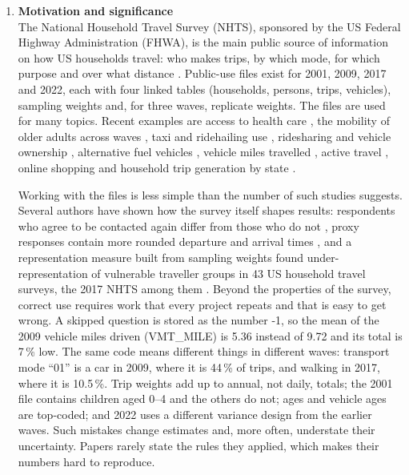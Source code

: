 \documentclass[preprint,12pt, a4paper]{elsarticle}
\begin{document}
\begin{enumerate}

\item \textbf{Motivation and significance}\label{sec:motivation}\\

The National Household Travel Survey (NHTS), sponsored by the US Federal Highway Administration (FHWA), is the main public source of information on how US households travel: who makes trips, by which mode, for which purpose and over what distance \cite{mcguckin}. Public-use files exist for 2001, 2009, 2017 and 2022, each with four linked tables (households, persons, trips, vehicles), sampling weights and, for three waves, replicate weights. The files are used for many topics. Recent examples are access to health care \cite{labban}, the mobility of older adults across waves \cite{buehler,akinlotan,lidbe}, taxi and ridehailing use \cite{conway,rafiq}, ridesharing and vehicle ownership \cite{zhang}, alternative fuel vehicles \cite{li}, vehicle miles travelled \cite{alberini,wu}, active travel \cite{yang}, online shopping \cite{zhou} and household trip generation by state \cite{naseralavi}.

Working with the files is less simple than the number of such studies suggests. Several authors have shown how the survey itself shapes results: respondents who agree to be contacted again differ from those who do not \cite{wang}, proxy responses contain more rounded departure and arrival times \cite{yoshikawa}, and a representation measure built from sampling weights found under-representation of vulnerable traveller groups in 43 US household travel surveys, the 2017 NHTS among them \cite{esekhaigbe}. Beyond the properties of the survey, correct use requires work that every project repeats and that is easy to get wrong. A skipped question is stored as the number -1, so the mean of the 2009 vehicle miles driven (VMT\_MILE) is 5.36 instead of 9.72 and its total is 7\,\% low. The same code means different things in different waves: transport mode ``01'' is a car in 2009, where it is 44\,\% of trips, and walking in 2017, where it is 10.5\,\%. Trip weights add up to annual, not daily, totals; the 2001 file contains children aged 0--4 and the others do not; ages and vehicle ages are top-coded; and 2022 uses a different variance design from the earlier waves. Such mistakes change estimates and, more often, understate their uncertainty. Papers rarely state the rules they applied, which makes their numbers hard to reproduce.


\end{enumerate}
\end{document}
